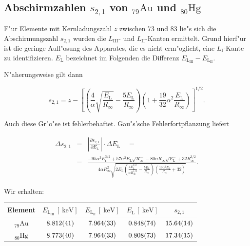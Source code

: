 	\subsection{Abschirmzahlen $s_{2,1}$ von ${}_{79}^{}\mathrm{Au}$ und ${}_{80}^{}\mathrm{Hg}$}
		\label{subsec:abschirm2}
		F"ur Elemente mit Kernladungszahl $z$ zwischen 73 und 83 lie"s sich die Abschirmungszahl $s_{2,1}$ wurden die $L_\mathrm{III}$- und $L_\mathrm{II}$-Kanten ermittelt.
		Grund hierf"ur ist die geringe Aufl"osung des Apparates, die es nicht erm"oglicht, eine $L_\mathrm{I}$-Kante zu identifizieren.
		$E_\mathrm{L}$ bezeichnet im Folgenden die Differenz $E_\mathrm{L_\mathrm{III}} - E_\mathrm{L_\mathrm{II}}$.
		
		N"aherungsweise gilt dann

		\begin{equation}
			s_{2,1} = z - \left[\left( \frac{4}{\alpha} \sqrt{\frac{E_\mathrm{L}}{R_\infty}} - \frac{5 E_\mathrm{L}}{R_\infty} \right)
			\left( 1 + \frac{19}{32}\alpha^2 \frac{E_\mathrm{L}}{R_\infty} \right)\right]^{1/2} . \nonumber
		\end{equation}

		Auch diese Gr"o"se ist fehlerbehaftet. Gau"s'sche Fehlerfortpflanzung liefert

		\begin{eqnarray*}
			\Delta s_{2,1} & = & \left|\frac{\partial s_{2,1}}{\partial E_\mathrm{L}}\right| \cdot \Delta E_\mathrm{L} \quad = \\
			& = & \frac{-95 \alpha^3 E_\mathrm{L}^{3/2} + 57 \alpha^2 E_\mathrm{L} \sqrt{R_\infty} - 80\alpha R_\infty \sqrt{E_\mathrm{L}} + 32 R_\infty^{3/2}}{4 \alpha R_\infty^2 \sqrt{2 E_\mathrm{L} \left( \frac{4E_\mathrm{L}^{1/2}}{\alpha R_\infty^{1/2}} - \frac{5E_\mathrm{L}}{R_\infty} \right) \left( \frac{19 \alpha^2 E_\mathrm{L}}{R_\infty} + 32 \right)}}.
		\end{eqnarray*}

		Wir erhalten:

		\begin{table}[h!]
			\centering
			\begin{tabular}{|c|c|c|c|c|}
				\hline
				Element & 
				$E_\mathrm{L_\mathrm{III}}\,[\SI{}{\kilo \electronvolt}]$ &
				$E_\mathrm{L_\mathrm{II}}\,[\SI{}{\kilo \electronvolt}]$ &
				$E_\mathrm{L}\,[\SI{}{\kilo \electronvolt}]$ & 
				$s_{2,1}$ \\
				\hline \hline
				${}_{79}^{}\mathrm{Au}$ & 
					$\SI{8.812 (41)}{}$ &
					$\SI{7.964 (33)}{}$ & 
					$\SI{.848 (74)}{}$ & 
					$\SI{15.64 (14)}{}$ \\
				${}_{80}^{}\mathrm{Hg}$ & 
					$\SI{8.773 (40)}{}$ &
					$\SI{7.964 (33)}{}$ &
					$\SI{.808 (73)}{}$ & 
					$\SI{17.34 (15)}{}$ \\
				\hline
			\end{tabular}
		\end{table}

